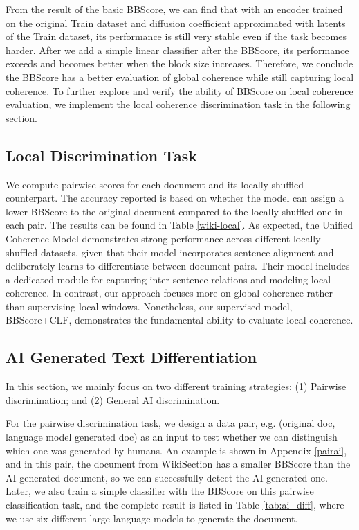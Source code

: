\documentclass[letterpaper]{article}
\begin{document}
From the result of the basic BBScore, we can find that with an encoder trained on the original Train dataset and diffusion coefficient approximated with latents of the Train dataset, its performance is still very stable even if the task becomes harder. After we add a simple linear classifier after the BBScore, its performance exceeds \cite{moon-etal-2019-unified} and becomes better when the block size increases. Therefore, we conclude the BBScore has a better evaluation of global coherence while still capturing local coherence. To further explore and verify the ability of BBScore on local coherence evaluation, we implement the local coherence discrimination task in the following section.



\subsection{Local Discrimination Task}
We compute pairwise scores for each document and its locally shuffled counterpart. The accuracy reported is based on whether the model can assign a lower BBScore to the original document compared to the locally shuffled one in each pair. The results can be found in Table \ref{wiki-local}. As expected, the Unified Coherence Model \citep{moon-etal-2019-unified} demonstrates strong performance across different locally shuffled datasets, given that their model incorporates sentence alignment and deliberately learns to differentiate between document pairs. Their model includes a dedicated module for capturing inter-sentence relations and modeling local coherence. In contrast, our approach focuses more on global coherence rather than supervising local windows. Nonetheless, our supervised model, BBScore+CLF, demonstrates the fundamental ability to evaluate local coherence.




\subsection{AI Generated Text Differentiation}
In this section, we mainly focus on two different training strategies: (1) Pairwise discrimination; and (2) General AI discrimination.

For the pairwise discrimination task, we design a data pair, e.g. (original doc, language model generated doc) as an input to test whether we can distinguish which one was generated by humans.
An example is shown in Appendix \ref{pairai}, and in this pair, the document from WikiSection has a smaller BBScore than the AI-generated document, so we can successfully detect the AI-generated one. Later, we also train a simple classifier with the BBScore on this pairwise classification task, and the complete result is listed in Table \ref{tab:ai_diff}, where we use six different large language models to generate the document.
\end{document}
